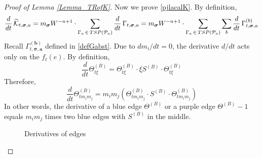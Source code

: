 \documentclass[10pt,reqno]{article}
\theoremstyle{plain} %
\theoremstyle{remark}
\numberwithin{equation}{section}
\begin{document}
\begin{proof}[Proof of Lemma \ref{Lemma_TRofK}]
\medskip
Now we prove \eqref{pjlacalK}. By definition,
$$
      \frac{d}{dt}\, \widetilde{ {\cal K}}_{t, \boldsymbol{\sigma}, \textbf{a}} =
     m_{\boldsymbol{\sigma}} W^{-n+1}\cdot \sum_{\Gamma_{\textbf{a}}\, \in\,  {TSP}({\cal P}_{\textbf{a}})} 
       \frac{d}{dt}\, \Gamma_{t, \boldsymbol{\sigma}
       , \textbf{a}}
       =   m_{\boldsymbol{\sigma}} W^{-n+1}\cdot \sum_{\Gamma_{\textbf{a}}\, \in\,  {TSP}({\cal P}_{\textbf{a}})}
       \sum_{\textbf{b}}
       \frac{d}{dt} \, \Gamma^{(\textbf{b})}_{t, \boldsymbol{\sigma}
       , \textbf{a}}
$$
 Recall $\Gamma^{(\textbf{b})}_{t, \boldsymbol{\sigma}, \textbf{a}}$ defined in \eqref{defGabst}. 
 Due to $ d m_i/dt = 0$, the derivative $d/dt$  acts only on the $f_t(e)$.   By definition, 
$$
\frac{d}{dt} \Theta^{(B)}_{t \xi} = \Theta^{(B)}_{t \xi} \cdot \xi S^{(B)} \cdot \Theta^{(B)}_{t \xi}
$$
Therefore, 
$$
\frac{d}{dt} \Theta^{(B)}_{t m_i m_j} = m_i m_j \left( \Theta^{(B)}_{t m_i m_j} \cdot S^{(B)} \cdot \Theta^{(B)}_{t m_i m_j}\right)
$$
In other words, the derivative of a blue edge $\Theta^{(B)}$ or a purple edge $\Theta^{(B)} - 1$ equals $m_i m_j$ times two blue edges with $S^{(B)}$ in the middle.

\begin{figure}[ht]
    \centering
    \caption{Derivatives of edges}
\end{figure}



\end{proof}
\end{document}
